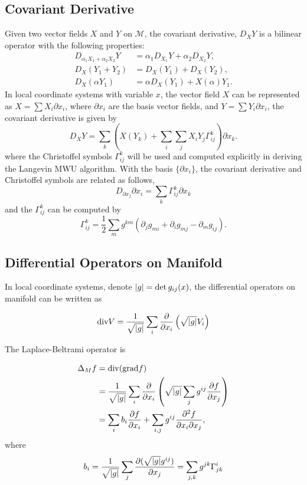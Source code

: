 \subsection{Covariant Derivative}
Given two vector fields $X$ and $Y$ on $\mathcal{M}$, the covariant derivative, $D_XY$ is a bilinear operator with the following properties:
\begin{align*}
D_{\alpha_1X_1+\alpha_2X_2}Y&=\alpha_1D_{X_1}Y+\alpha_2D_{X_2}Y,
\\
D_X(Y_1+Y_2)&=D_X(Y_1)+D_X(Y_2),
\\
D_X(\alpha Y_1)&=\alpha D_X(Y_1)+X(\alpha)Y_1.
\end{align*}
In local coordinate systems with variable $x$, the vector field $X$ can be represented as $X=\sum X_i\partial x_i$, where $\partial x_i$ are the basis vector fields, and $Y=\sum Y_i\partial x_i$, the covariant derivative is given by 
\[
D_XY=\sum_k\left(X(Y_k)+\sum_i\sum_jX_iY_j\Gamma^k_{ij}\right)\partial x_k.
\]
where the Christoffel symbols $\Gamma_{ij}^k$ will be used and computed explicitly in deriving the Langevin MWU algorithm. With the basis $\{\partial x_i\}$, the covariant derivative and Christoffel symbols are related as follows,
\[
D_{\partial x_j}\partial x_i=\sum_k\Gamma_{ij}^k\partial x_k
\]
and the $\Gamma_{ij}^k$ can be computed by
\[
\Gamma_{ij}^k=\frac{1}{2}\sum_mg^{km}(\partial_jg_{mi}+\partial_ig_{mj}-\partial_mg_{ij}).
\]

\subsection{Differential Operators on Manifold}
In local coordinate systems, denote $\left|g\right|=\det{g_{ij}(x)}$, the differential operators on manifold can be written as

\[
\mathrm{div} V=\frac{1}{\sqrt{\left|g\right|}}\sum_i\frac{\partial}{\partial x_i}\left(\sqrt{\left|g\right|}V_i\right)
\]

The Laplace-Beltrami operator is

\begin{align}
\Delta_{M}f&=\mathrm{div}(\mathrm{grad} f)
\\
&=\frac{1}{\sqrt{\left|g\right|}}\sum_i\frac{\partial}{\partial x_i}\left(\sqrt{\left|g\right|}\sum_jg^{ij}\frac{\partial f}{\partial x_j}\right)
\\
&=\sum_{i}b_i\frac{\partial f}{\partial x_i}+\sum_{i,j}g^{ij}\frac{\partial^2f}{\partial x_i\partial x_j},
\end{align}
where
\[
b_i=\frac{1}{\sqrt{\left|g\right|}}\sum_j\frac{\partial (\sqrt{\left|g\right|}g^{ij})}{\partial x_j}=\sum_{j,k}g^{jk}\Gamma^i_{jk}
\]
